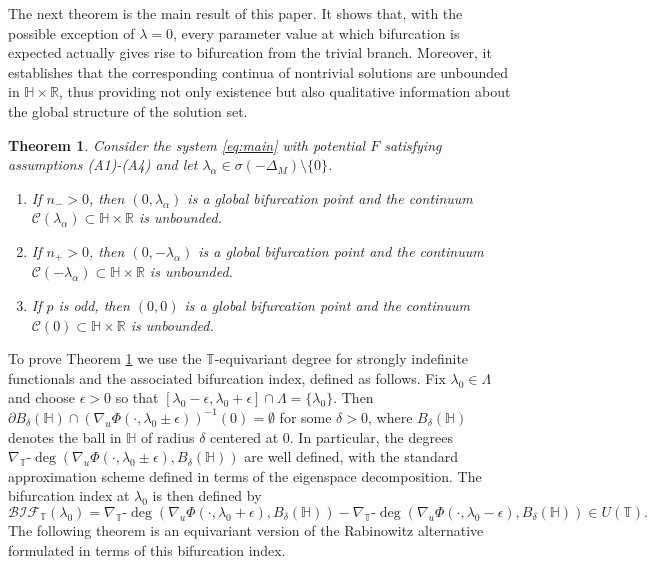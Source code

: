 \documentclass[reqno,twoside,12pt]{amsart}
\newtheorem{Theorem}[Remark]{Theorem}
\newcommand{\bH}{\mathbb{H}}
\newcommand{\bR}{\mathbb{R}}
\newcommand{\bT}{\mathbb{T}}
\newcommand{\cC}{\mathcal{C}}
\numberwithin{equation}{section} \errorcontextlines=0
\newcommand{\BIF}{\mathcal{BIF}}
\begin{document}
The next theorem is the main result of this paper. It shows that, with the possible exception of $\lambda=0$, every parameter value at which bifurcation is expected actually gives rise to bifurcation from the trivial branch. Moreover, it establishes that the corresponding continua of nontrivial solutions are unbounded in $\bH\times\bR$, thus providing not only existence but also qualitative information about the global structure of the solution set.

\begin{Theorem}\label{thm:unbound}
Consider the system \eqref{eq:main} with potential $F$ satisfying assumptions \textup{(A1)}-\textup{(A4)} and let $\lambda_\alpha\in\sigma(-\Delta_M)\setminus\{0\}$.
\begin{enumerate}
\item If $n_->0$, then $(0,\lambda_\alpha)$ is a global bifurcation point and the continuum $\cC(\lambda_\alpha)\subset\bH\times\bR$  is unbounded.
\item If $n_+>0$, then $(0,-\lambda_\alpha)$ is a global bifurcation point and the continuum $\cC(-\lambda_\alpha)\subset\bH\times\bR$  is unbounded.
\item If $p$ is odd, then $(0,0)$ is a global bifurcation point and the continuum $\cC(0)\subset\bH\times\bR$ is unbounded.
\end{enumerate}
\end{Theorem}

To prove Theorem \ref{thm:unbound} we use the $\bT$-equivariant degree for strongly indefinite functionals and the associated bifurcation index, defined as follows.
Fix $\lambda_0\in\Lambda$ and choose $\epsilon>0$ so that
$
[\lambda_0-\epsilon,\lambda_0+\epsilon]\cap\Lambda=\{\lambda_0\}.
$
Then
$
\partial B_\delta(\bH)\cap(\nabla_u\Phi(\cdot,\lambda_0\pm\epsilon))^{-1}(0)=\emptyset
$
for some $\delta>0$,
where $B_\delta(\bH)$ denotes the ball in $\bH$ of radius $\delta$ centered at $0$. In particular, the degrees
$
\nabla_\bT\text{-}\deg(\nabla_u\Phi(\cdot,\lambda_0\pm\epsilon),B_\delta(\bH))
$
are well defined, with the standard approximation scheme defined in terms of the eigenspace decomposition.
The bifurcation index at $\lambda_0$ is then defined by
\[
\BIF_\bT(\lambda_0)=\nabla_\bT\text{-}\deg(\nabla_u\Phi(\cdot,\lambda_0+\epsilon),B_\delta(\bH))-\nabla_\bT\text{-}\deg(\nabla_u\Phi(\cdot,\lambda_0-\epsilon),B_\delta(\bH))\in U(\bT).
\]
The following theorem is an equivariant version of the Rabinowitz alternative formulated in terms of this bifurcation index.
\end{document}
